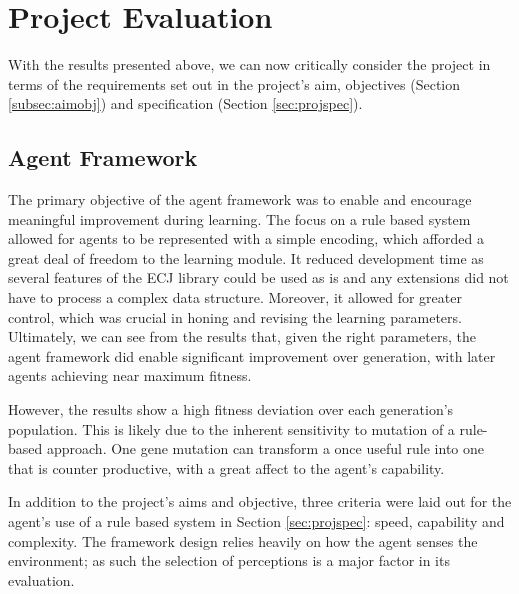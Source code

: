 
\section{Project Evaluation}
\label{sec:eval}

With the results presented above, we can now critically consider the project in terms of the requirements set out in the project's aim, objectives (Section \ref{subsec:aimobj}) and specification (Section \ref{sec:projspec}).


\subsection{Agent Framework}

The primary objective of the agent framework was to enable and encourage meaningful improvement during learning. The focus on a rule based system allowed for agents to be represented with a simple encoding, which afforded a great deal of freedom to the learning module. It reduced development time as several features of the ECJ library could be used as is and any extensions did not have to process a complex data structure. Moreover, it allowed for greater control, which was crucial in honing and revising the learning parameters. Ultimately, we can see from the results that, given the right parameters, the agent framework did enable significant improvement over generation, with later agents achieving near maximum fitness.

However, the results show a high fitness deviation over each generation's population. This is likely due to the inherent sensitivity to mutation of a rule-based approach. One gene mutation can transform a once useful rule into one that is counter productive, with a great affect to the agent's capability.

In addition to the project's aims and objective, three criteria were laid out for the agent's use of a rule based system in Section \ref{sec:projspec}: speed, capability and complexity. The framework design relies heavily on how the agent senses the environment; as such the selection of perceptions is a major factor in its evaluation.

